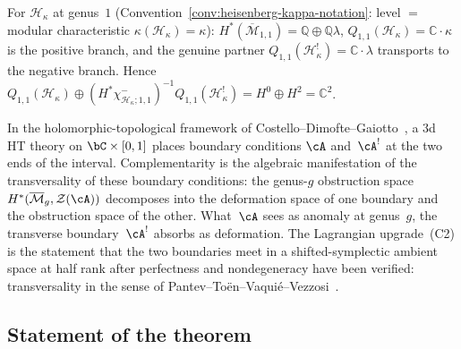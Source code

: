 \begin{remark}
For $\mathcal{H}_\kappa$ at genus~$1$
(Convention~\ref{conv:heisenberg-kappa-notation}: level $=$ modular
characteristic $\kappa(\mathcal{H}_\kappa) = \kappa$):
$H^*(\overline{\mathcal{M}}_{1,1})=\mathbb{Q}\oplus\mathbb{Q}\lambda$,
$Q_{1,1}(\mathcal{H}_\kappa)=\mathbb{C}\cdot\kappa$ is the positive
branch, and the genuine partner
$Q_{1,1}(\mathcal{H}_\kappa^!)=\mathbb{C}\cdot\lambda$ transports to
the negative branch.  Hence
$Q_{1,1}(\mathcal H_\kappa)\oplus
(H^*\chi^-_{\mathcal H_\kappa;1,1})^{-1}
Q_{1,1}(\mathcal H_\kappa^!)=H^0\oplus H^2=\mathbb C^2$.
\end{remark}

\begin{remark}
\label{rem:complementarity-transversality}
%
%
In the holomorphic-topological framework of
Costello--Dimofte--Gaiotto~\cite{CDG2024,CG17}, a $3$d HT theory
on $\bC \times [0,1]$ places boundary conditions $\cA$
and~$\cA^!$ at the two ends of the interval. Complementarity is
the algebraic manifestation of the transversality of these
boundary conditions: the genus-$g$ obstruction space
$H^*(\overline{\mathcal{M}}_g, \mathcal{Z}(\cA))$ decomposes
into the deformation space of one boundary and the obstruction
space of the other. What~$\cA$ sees as anomaly at genus~$g$,
the transverse boundary~$\cA^!$ absorbs as deformation.
The Lagrangian upgrade~(C2) is the statement that the two
boundaries meet in a shifted-symplectic ambient space at
half rank after perfectness and nondegeneracy have been verified:
transversality in the sense of
Pantev--To\"en--Vaqui\'e--Vezzosi~\cite{PTVV13}.
\end{remark}

\subsection{Statement of the theorem}

